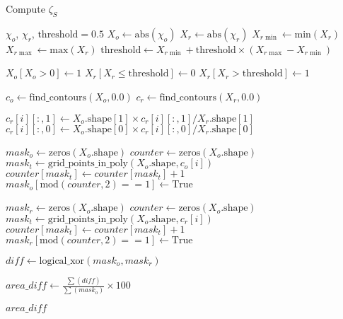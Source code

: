 \begin{algorithm}
    \caption{Compute $\zeta_S$}
    \begin{algorithmic}[1]
        \REQUIRE $\chi_o$, $\chi_r$, $\text{threshold} = 0.5$
        \STATE $X_o \gets \text{abs}(\chi_o)$
        \STATE $X_r \gets \text{abs}(\chi_r)$
        \STATE $X_{r\min} \gets \text{min}(X_r)$
        \STATE $X_{r\max} \gets \text{max}(X_r)$
        \STATE $\text{threshold} \gets X_{r\min} + \text{threshold} \times (X_{r\max} - X_{r\min})$
        
        \STATE $X_o[X_o > 0] \gets 1$
        \STATE $X_r[X_r \le \text{threshold}] \gets 0$
        \STATE $X_r[X_r > \text{threshold}] \gets 1$
        
        \ENDIF
        
        \STATE $c_o \gets \text{find\_contours}(X_o, 0.0)$
        \STATE $c_r \gets \text{find\_contours}(X_r, 0.0)$
        
            \STATE $c_r[i][:, 1] \gets X_o.\text{shape}[1] \times c_r[i][:, 1] / X_r.\text{shape}[1]$
            \STATE $c_r[i][:, 0] \gets X_o.\text{shape}[0] \times c_r[i][:, 0] / X_r.\text{shape}[0]$
        \ENDFOR
        
        \STATE $mask_o \gets \text{zeros}(X_o.\text{shape})$
        \STATE $counter \gets \text{zeros}(X_o.\text{shape})$
            \STATE $mask_t \gets \text{grid\_points\_in\_poly}(X_o.\text{shape}, c_o[i])$
            \STATE $counter[mask_t] \gets counter[mask_t] + 1$
        \ENDFOR
        \STATE $mask_o[\text{mod}(counter, 2) == 1] \gets \text{True}$
        
        \STATE $mask_r \gets \text{zeros}(X_o.\text{shape})$
        \STATE $counter \gets \text{zeros}(X_o.\text{shape})$
            \STATE $mask_t \gets \text{grid\_points\_in\_poly}(X_o.\text{shape}, c_r[i])$
            \STATE $counter[mask_t] \gets counter[mask_t] + 1$
        \ENDFOR
        \STATE $mask_r[\text{mod}(counter, 2) == 1] \gets \text{True}$
        
        \STATE $diff \gets \text{logical\_xor}(mask_o, mask_r)$
        
        \STATE $area\_diff \gets \frac{\sum(diff)}{\sum(mask_o)} \times 100$
        
        \RETURN $area\_diff$
    \end{algorithmic}
\end{algorithm}